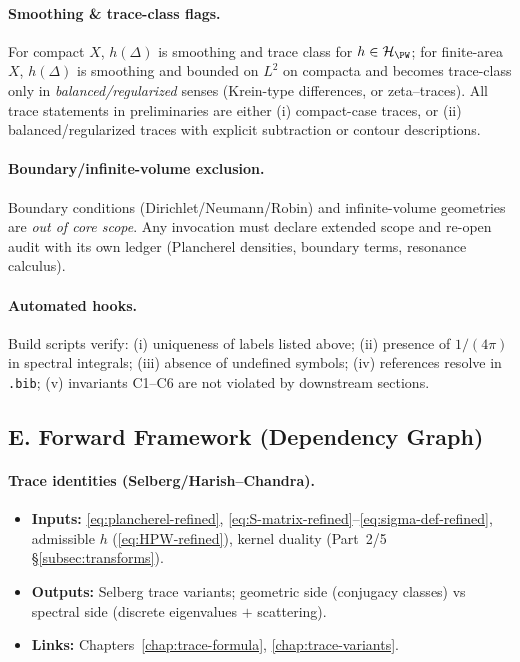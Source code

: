 \paragraph{Smoothing \& trace-class flags.}
For compact $X$, $h(\Delta)$ is smoothing and trace class for $h\in\mathcal H_{\PW}$; for finite-area $X$, $h(\Delta)$ is smoothing and bounded on $L^2$ on compacta and becomes trace-class only in \emph{balanced/regularized} senses (Krein-type differences, or zeta–traces). All trace statements in preliminaries are either (i) compact-case traces, or (ii) balanced/regularized traces with explicit subtraction or contour descriptions.

\paragraph{Boundary/infinite-volume exclusion.}
Boundary conditions (Dirichlet/Neumann/Robin) and infinite-volume geometries are \emph{out of core scope}. Any invocation must declare extended scope and re-open audit with its own ledger (Plancherel densities, boundary terms, resonance calculus).

\paragraph{Automated hooks.}
Build scripts verify:
(i) uniqueness of labels listed above;
(ii) presence of $1/(4\pi)$ in spectral integrals;
(iii) absence of undefined symbols;
(iv) references resolve in \texttt{.bib};
(v) invariants C1–C6 are not violated by downstream sections.


\subsection*{E. Forward Framework (Dependency Graph)}
\label{subsec:forward-refined}

\paragraph{Trace identities (Selberg/Harish–Chandra).}
\begin{itemize}
  \item \textbf{Inputs:} \eqref{eq:plancherel-refined}, \eqref{eq:S-matrix-refined}–\eqref{eq:sigma-def-refined}, admissible $h$ (\eqref{eq:HPW-refined}), kernel duality (Part~2/5 \S\ref{subsec:transforms}).
  \item \textbf{Outputs:} Selberg trace variants; geometric side (conjugacy classes) vs spectral side (discrete eigenvalues $+$ scattering).
  \item \textbf{Links:} Chapters~\ref{chap:trace-formula}, \ref{chap:trace-variants}.
\end{itemize}

